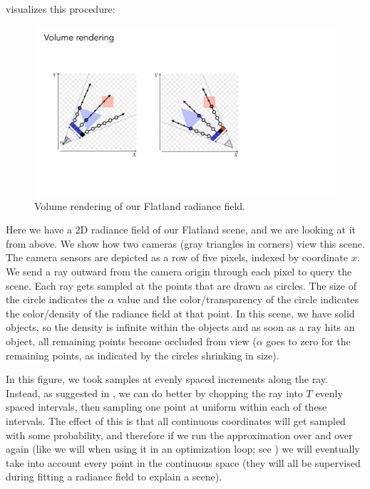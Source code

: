 \Fig{\ref{fig:nerfs:flatland_volume_rendering}} visualizes this procedure:
\begin{figure}[h!]
    \centerline{
    \includegraphics[width=0.75\linewidth]{figures/nerfs/flatland_volume_rendering.pdf}
    }
    \caption{Volume rendering of our Flatland radiance field.}
    \label{fig:nerfs:flatland_volume_rendering}
\end{figure}

Here we have a 2D radiance field of our Flatland scene, and we are looking at it from above. 
We show how two cameras (gray triangles in corners) view this scene. The camera sensors are depicted as a row of five pixels, indexed by coordinate $x$. 
We send a ray outward from the camera origin through each pixel to query the scene. Each ray gets sampled at the points that are drawn as circles. 
The size of the circle indicates the $\alpha$ value and the color/transparency of the circle indicates the color/density of the radiance field at that point. 
In this scene, we have solid objects, so the density is infinite within the objects and as soon as a ray hits an object, all remaining points become occluded 
from view ($\alpha$ goes to zero for the remaining points, as indicated by the circles shrinking in size).

In this figure, we took samples at evenly spaced increments along the ray. Instead, as suggested in \cite{mildenhall2020nerf}, 
we can do better by chopping the ray into $T$ evenly spaced intervals, then sampling one point at uniform within each of these intervals. 
The effect of this is that all continuous coordinates will get sampled with some probability, and therefore if we run the approximation over 
and over again (like we will when using it in an optimization loop; see \sect{\ref{sec:nerfs:nerf_section}}) we will eventually take into 
account every point in the continuous space (they will all be supervised during fitting a radiance field to explain a scene). 


